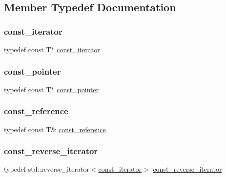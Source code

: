 \subsection{Member Typedef Documentation}
\mbox{\label{classvector_a2fc97dce62b7053449cc868607540dba}} 
\subsubsection{\texorpdfstring{const\+\_\+iterator}{const\_iterator}}
{\footnotesize\ttfamily typedef const T$\ast$ \mbox{\hyperlink{classvector_a2fc97dce62b7053449cc868607540dba}{const\+\_\+iterator}}}

\mbox{\label{classvector_a53d259f0075b22d7646e373816830e8e}} 
\subsubsection{\texorpdfstring{const\+\_\+pointer}{const\_pointer}}
{\footnotesize\ttfamily typedef const T$\ast$ \mbox{\hyperlink{classvector_a53d259f0075b22d7646e373816830e8e}{const\+\_\+pointer}}}

\mbox{\label{classvector_af9ba3e25df088c62f7d535b91672cda9}} 
\subsubsection{\texorpdfstring{const\+\_\+reference}{const\_reference}}
{\footnotesize\ttfamily typedef const T\& \mbox{\hyperlink{classvector_af9ba3e25df088c62f7d535b91672cda9}{const\+\_\+reference}}}

\mbox{\label{classvector_a421ef78ccdc84f0f6b2b14e2732527ba}} 
\subsubsection{\texorpdfstring{const\+\_\+reverse\+\_\+iterator}{const\_reverse\_iterator}}
{\footnotesize\ttfamily typedef std\+::reverse\+\_\+iterator$<$\mbox{\hyperlink{classvector_a2fc97dce62b7053449cc868607540dba}{const\+\_\+iterator}}$>$ \mbox{\hyperlink{classvector_a421ef78ccdc84f0f6b2b14e2732527ba}{const\+\_\+reverse\+\_\+iterator}}}

